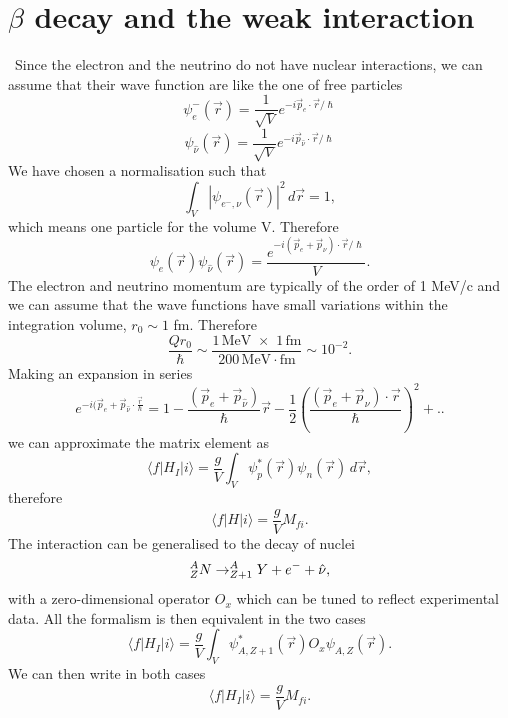 \chapter{$\beta$ decay and the weak interaction}
\label{chap:WeakInteraction}

\
Since the electron and the neutrino do not have nuclear interactions, we can assume that their wave function are like the one of free particles
\begin{equation*}
    \psi_e^{-}(\Vec{r}) = \frac{1}{\sqrt{V}}e^{-i\Vec{p}_e\cdot\Vec{r}/\hslash}
\end{equation*}
\begin{equation*}
    \psi_{\hat{\nu}}(\Vec{r}) = \frac{1}{\sqrt{V}}e^{-i\Vec{p}_{\hat{\nu}}\cdot\Vec{r}/\hslash}
\end{equation*}
We have chosen a normalisation such that
\begin{equation*}
    \int_V |\psi_{e^-,\nu}(\Vec{r})|^2\,d\Vec{r} = 1,
\end{equation*}
which means one particle for the volume V. Therefore
\begin{equation*}
    \psi_e(\Vec{r})\psi_{\hat{\nu}}(\Vec{r}) = \frac{e^{-i(\Vec{p}_e+\Vec{p}_{\nu})\cdot \Vec{r}/\hslash}}{V}.
\end{equation*}
The electron and neutrino momentum are typically of the order of 1 MeV/c and we can assume that the wave functions have small variations within the integration volume, $r_0 \sim 1$ fm. Therefore
\begin{equation*}
    \frac{Qr_0}{\hslash} \sim \frac{1\,\mbox{MeV}\,\,\times\,\,1\,\mbox{fm}}{200\,\mbox{MeV}\cdot\mbox{fm}} \sim 10^{-2}.
\end{equation*}
Making an expansion in series
\begin{equation*}
    e^{-i(\Vec{p}_e+\Vec{p}_{\hat{\nu}}\cdot\frac{\Vec{r}}{\hslash}} = 1 - \frac{(\Vec{p}_e + \Vec{p}_{\hat{\nu}})}{\hslash}\Vec{r} - \frac{1}{2}\left(\frac{(\Vec{p}_e+\Vec{p}_\nu)\cdot\Vec{r}}{\hslash}\right)^2 + ..
\end{equation*}
we can approximate the matrix element as 
\begin{equation*}
    \langle f | H_I | i \rangle = \frac{g}{V}\int_{V}\psi_p^*(\Vec{r})\psi_{n}(\Vec{r})\,d\Vec{r},
\end{equation*}
therefore 
\begin{equation*}
    \langle f | H | i \rangle = \frac{g}{V}M_{fi}.
\end{equation*}
The interaction can be generalised to the decay of nuclei 
\begin{equation*}
    _{\tiny{Z}}^{\tiny{A}}N \rightarrow _{\tiny{Z+1}}^{\tiny{A}}Y + e^-+\hat{\nu},
\end{equation*}
with a zero-dimensional operator $O_x$ which can be tuned to reflect experimental data. All the formalism is then equivalent in the two cases
\begin{equation*}
    \langle f | H_I | i \rangle = \frac{g}{V}\int_V \psi_{A,Z+1}^*(\Vec{r})O_x\psi_{A,Z}(\Vec{r}).
\end{equation*}
We can then write in both cases
\begin{equation*}
    \langle f | H_I | i \rangle = \frac{g}{V}M_{fi}.
\end{equation*}

